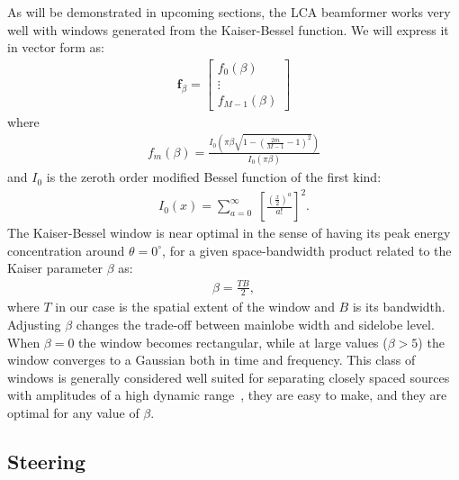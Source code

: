\documentclass[10pt,journal,draftclsnofoot,onecolumn]{IEEEtran}
\newcommand\bmat[1]{\begin{bmatrix}#1\end{bmatrix}}
\newcommand\sumb[2]{\sum\limits_{#1}^{#2}\;}
\renewcommand\vec[1]{\boldsymbol{#1}}
\newcommand\1{\vec 1}
\newcommand*\f{\vec f}
\begin{document}
As will be demonstrated in upcoming sections, the LCA beamformer works very well with windows generated from the Kaiser-Bessel function. We will express it in vector form as:
%
\begin{align}
\f_\beta = \bmat{
f_0(\beta) \\
\vdots\\
f_{M-1}(\beta)
}\label{eq:kaiser_window_vector}
\end{align}
%
where
%
\begin{align}
f_m(\beta) = \frac{I_0\left(\pi\beta\sqrt{1-\left(\frac{2m}{M-1}-1\right)^2}\right)}{I_0(\pi\beta)}\label{eq:kaiser_window_element}
\end{align}
%
and $I_0$ is the zeroth order modified Bessel function of the first kind:
%
\begin{align}
I_0(x) = \sumb{a=0}{\infty} \left[ \frac{\left(\frac{x}{2}\right)^a}{a!} \right]^2.\label{eq:modified_bessel_first_kind}
\end{align}
%
The Kaiser-Bessel window is near optimal in the sense of having its peak energy concentration around $\theta=0^\circ$, for a given space-bandwidth product related to the Kaiser parameter $\beta$ as:
%
\begin{align}
\beta = \frac{TB}{2},
\end{align}
%
where $T$ in our case is the spatial extent of the window and $B$ is its bandwidth. Adjusting $\beta$ changes the trade-off between mainlobe width and sidelobe level. When $\beta=0$ the window becomes rectangular, while at large values ($\beta>5$) the window converges to a Gaussian both in time and frequency. This class of windows is generally considered well suited for separating closely spaced sources with amplitudes of a high dynamic range~\cite{Harris1978}, they are easy to make, and they are optimal for any value of $\beta$.


\subsection{Steering}\label{sec:lca_steering}
\end{document}
